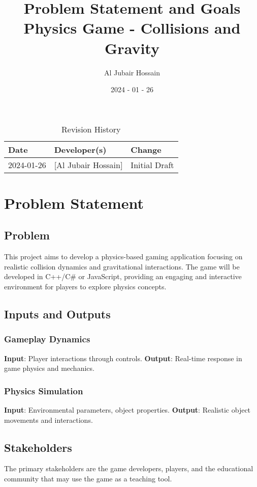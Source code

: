 \documentclass{article}
\title{Problem Statement and Goals\\\textbf{Physics Game - Collisions and Gravity}}
\author{Al Jubair Hossain} %
\date{2024 - 01 - 26}
\begin{document}
\maketitle

\begin{table}[hp]
\caption{Revision History} \label{TblRevisionHistory}
\begin{tabularx}{\textwidth}{llX}
\toprule
\textbf{Date} & \textbf{Developer(s)} & \textbf{Change}\\
\midrule
2024-01-26 & [Al Jubair Hossain] & Initial Draft\\
\bottomrule
\end{tabularx}
\end{table}

\section{Problem Statement}

\subsection{Problem}

This project aims to develop a physics-based gaming application focusing on realistic collision dynamics and gravitational interactions. The game will be developed in C++/C\# or JavaScript, providing an engaging and interactive environment for players to explore physics concepts.

\subsection{Inputs and Outputs}

\subsubsection{Gameplay Dynamics}
\textbf{Input}: Player interactions through controls.
\textbf{Output}: Real-time response in game physics and mechanics.

\subsubsection{Physics Simulation}
\textbf{Input}: Environmental parameters, object properties.
\textbf{Output}: Realistic object movements and interactions.

\subsection{Stakeholders}
The primary stakeholders are the game developers, players, and the educational community that may use the game as a teaching tool.
\end{document}
